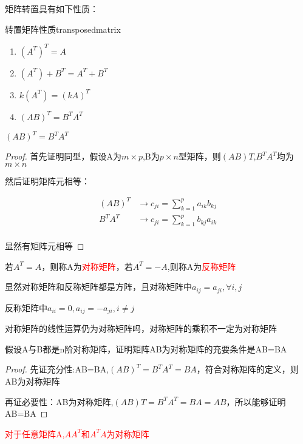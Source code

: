 矩阵转置具有如下性质：

\begin{theorem}{转置矩阵性质}{transposedmatrix}
	\begin{enumerate}
		\item  $(A^T)^T=A$
		\item $(A^T)+B^T=A^T+B^T$
		\item $k(A^T)=(kA)^T$
		\item $(AB)^T=B^TA^T$
	\end{enumerate}
\end{theorem}

\begin{example}
	$(AB)^T=B^TA^T$

	\begin{proof}
		首先证明同型，假设A为$m\times p$,B为$p\times n$型矩阵，则$(AB)T$,$B^TA^T$均为$m\times n$

		然后证明矩阵元相等：

		$$
		\begin{aligned}
			(AB)^T&\rightarrow c_{ji}=\sum_{k=1}^p a_{ik}b_{kj}\\
			B^TA^T&\rightarrow c_{ji}=\sum_{k=1}^p b_{kj}a_{ik}\\
		\end{aligned}
		$$

		显然有矩阵元相等
	\end{proof}
\end{example}

若$A^T=A$，则称A为\textcolor{red}{对称矩阵}，若$A^T=-A$,则称A为\textcolor{red}{反称矩阵}

显然对称矩阵和反称矩阵都是方阵，且对称矩阵中$a_{ij}=a_{ji},\forall  i,j$

反称矩阵中$a_{ii}=0,a_{ij}=-a_{ji},i\neq j$

对称矩阵的线性运算仍为对称矩阵吗，对称矩阵的乘积不一定为对称矩阵

\begin{example}
	假设A与B都是n阶对称矩阵，证明矩阵AB为对称矩阵的充要条件是AB=BA

	\begin{proof}
		先证充分性:AB=BA,$(AB)^T=B^TA^T=BA$，符合对称矩阵的定义，则AB为对称矩阵

		再证必要性：AB为对称矩阵,$(AB)T=B^TA^T=BA=AB$，所以能够证明AB=BA
	\end{proof}

	\textcolor{red}{对于任意矩阵A,$AA^T$和$A^TA$为对称矩阵}

\end{example}